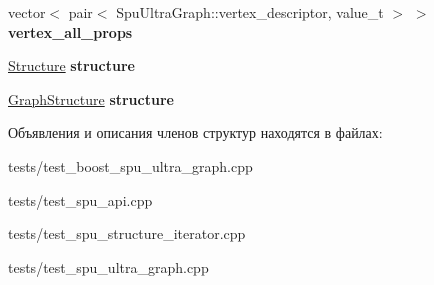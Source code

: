 \begin{DoxyCompactItemize}
vector$<$ pair$<$ Spu\+Ultra\+Graph\+::vertex\+\_\+descriptor, value\+\_\+t $>$ $>$ {\bfseries vertex\+\_\+all\+\_\+props}
\item 
\mbox{\label{struct_fixture_aa47a5a816608e13b46e9ceb1ee17a61a}} 
\hyperlink{class_s_p_u_1_1_structure}{Structure} {\bfseries structure}
\item 
\mbox{\label{struct_fixture_a333f197df82ad1755f5bda4b0d9aa431}} 
\hyperlink{class_s_p_u___g_r_a_p_h_1_1_graph_structure}{Graph\+Structure} {\bfseries structure}
\end{DoxyCompactItemize}


Объявления и описания членов структур находятся в файлах\+:\begin{DoxyCompactItemize}
\item 
tests/test\+\_\+boost\+\_\+spu\+\_\+ultra\+\_\+graph.\+cpp\item 
tests/test\+\_\+spu\+\_\+api.\+cpp\item 
tests/test\+\_\+spu\+\_\+structure\+\_\+iterator.\+cpp\item 
tests/test\+\_\+spu\+\_\+ultra\+\_\+graph.\+cpp\end{DoxyCompactItemize}
